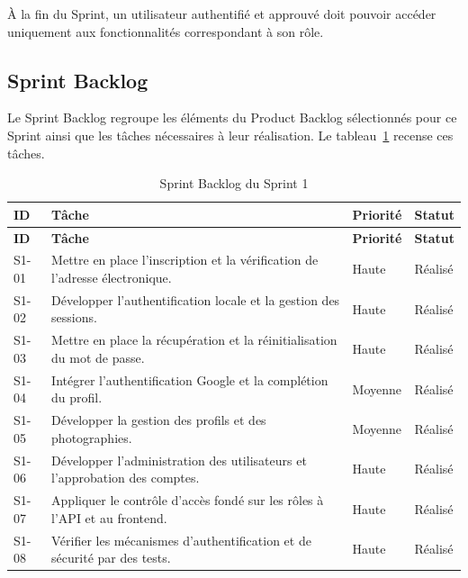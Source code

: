 À la fin du Sprint, un utilisateur authentifié et approuvé doit pouvoir accéder uniquement aux fonctionnalités correspondant à son rôle.

\subsection{Sprint Backlog}

Le Sprint Backlog regroupe les éléments du Product Backlog sélectionnés pour ce Sprint ainsi que les tâches nécessaires à leur réalisation. Le tableau~\ref{tab:sprint1-backlog} recense ces tâches.

{\small
\setlength{\tabcolsep}{5pt}
\begin{longtable}{|p{1cm}|p{10.3cm}|p{1.5cm}|p{1.4cm}|}
\caption{Sprint Backlog du Sprint 1}
\label{tab:sprint1-backlog}\\
\hline
\textbf{ID} & \textbf{Tâche} & \textbf{Priorité} & \textbf{Statut} \\
\hline
\endfirsthead

\hline
\textbf{ID} & \textbf{Tâche} & \textbf{Priorité} & \textbf{Statut} \\
\hline
\endhead

S1-01 &
Mettre en place l'inscription et la vérification de l'adresse électronique. &
Haute & Réalisé \\
\hline

S1-02 &
Développer l'authentification locale et la gestion des sessions. &
Haute & Réalisé \\
\hline

S1-03 &
Mettre en place la récupération et la réinitialisation du mot de passe. &
Haute & Réalisé \\
\hline

S1-04 &
Intégrer l'authentification Google et la complétion du profil. &
Moyenne & Réalisé \\
\hline

S1-05 &
Développer la gestion des profils et des photographies. &
Moyenne & Réalisé \\
\hline

S1-06 &
Développer l'administration des utilisateurs et l'approbation des comptes. &
Haute & Réalisé \\
\hline

S1-07 &
Appliquer le contrôle d'accès fondé sur les rôles à l'API et au frontend. &
Haute & Réalisé \\
\hline

S1-08 &
Vérifier les mécanismes d'authentification et de sécurité par des tests. &
Haute & Réalisé \\
\hline
\end{longtable}}

